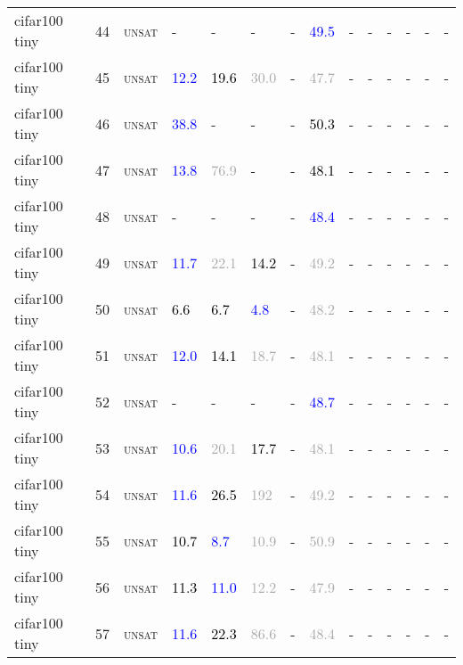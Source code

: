 \begin{center}
{\begin{longtable}{@{}llllllllllllll@{}}
cifar100 tiny & 44 & \textsc{unsat} & - & - & - & - & \textcolor{blue}{49.5} & - & - & - & - & - & - \\
cifar100 tiny & 45 & \textsc{unsat} & \textcolor{blue}{12.2} & \textcolor{black}{19.6} & \textcolor{darkgray}{30.0} & - & \textcolor{darkgray}{47.7} & - & - & - & - & - & - \\
cifar100 tiny & 46 & \textsc{unsat} & \textcolor{blue}{38.8} & - & - & - & \textcolor{black}{50.3} & - & - & - & - & - & - \\
cifar100 tiny & 47 & \textsc{unsat} & \textcolor{blue}{13.8} & \textcolor{darkgray}{76.9} & - & - & \textcolor{black}{48.1} & - & - & - & - & - & - \\
cifar100 tiny & 48 & \textsc{unsat} & - & - & - & - & \textcolor{blue}{48.4} & - & - & - & - & - & - \\
cifar100 tiny & 49 & \textsc{unsat} & \textcolor{blue}{11.7} & \textcolor{darkgray}{22.1} & \textcolor{black}{14.2} & - & \textcolor{darkgray}{49.2} & - & - & - & - & - & - \\
cifar100 tiny & 50 & \textsc{unsat} & \textcolor{black}{6.6} & \textcolor{black}{6.7} & \textcolor{blue}{4.8} & - & \textcolor{darkgray}{48.2} & - & - & - & - & - & - \\
cifar100 tiny & 51 & \textsc{unsat} & \textcolor{blue}{12.0} & \textcolor{black}{14.1} & \textcolor{darkgray}{18.7} & - & \textcolor{darkgray}{48.1} & - & - & - & - & - & - \\
cifar100 tiny & 52 & \textsc{unsat} & - & - & - & - & \textcolor{blue}{48.7} & - & - & - & - & - & - \\
cifar100 tiny & 53 & \textsc{unsat} & \textcolor{blue}{10.6} & \textcolor{darkgray}{20.1} & \textcolor{black}{17.7} & - & \textcolor{darkgray}{48.1} & - & - & - & - & - & - \\
cifar100 tiny & 54 & \textsc{unsat} & \textcolor{blue}{11.6} & \textcolor{black}{26.5} & \textcolor{darkgray}{192} & - & \textcolor{darkgray}{49.2} & - & - & - & - & - & - \\
cifar100 tiny & 55 & \textsc{unsat} & \textcolor{black}{10.7} & \textcolor{blue}{8.7} & \textcolor{darkgray}{10.9} & - & \textcolor{darkgray}{50.9} & - & - & - & - & - & - \\
cifar100 tiny & 56 & \textsc{unsat} & \textcolor{black}{11.3} & \textcolor{blue}{11.0} & \textcolor{darkgray}{12.2} & - & \textcolor{darkgray}{47.9} & - & - & - & - & - & - \\
cifar100 tiny & 57 & \textsc{unsat} & \textcolor{blue}{11.6} & \textcolor{black}{22.3} & \textcolor{darkgray}{86.6} & - & \textcolor{darkgray}{48.4} & - & - & - & - & - & - \\

\end{longtable}}
\end{center}
